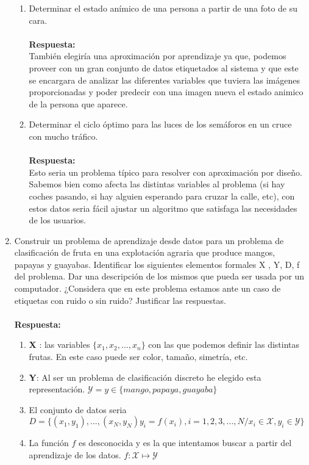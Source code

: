 \documentclass[12pt,a4paper]{article}
\begin{document}
\begin{enumerate}
\begin{enumerate}
		\item Determinar el estado anímico de una persona a partir de una foto de su cara.\\\\		\textbf{Respuesta:}\\
		También elegiría una aproximación por aprendizaje ya que, podemos proveer con un gran conjunto de datos etiquetados al sistema y que este se encargara de analizar las diferentes variables  que tuviera las imágenes proporcionadas y poder predecir con una imagen nueva el estado animico de la persona que aparece. 
		\item Determinar el ciclo óptimo para las luces de los semáforos en un cruce con mucho tráfico.\\\\		\textbf{Respuesta:}\\
		Esto seria un problema típico para resolver con aproximación por diseño. Sabemos bien como afecta las distintas variables al problema (si hay coches pasando, si  hay alguien esperando para cruzar la calle, etc), con estos datos seria fácil ajustar un algoritmo que satisfaga las necesidades de los usuarios.
	\end{enumerate}
	\item Construir un problema de aprendizaje desde datos para un problema de clasificación de fruta en una explotación agraria que produce mangos, papayas y guayabas. Identificar los siguientes elementos formales X , Y, D, f del problema. Dar una descripción de los mismos que pueda ser usada por un computador. ¿Considera que en este problema estamos ante un caso de etiquetas con ruido o sin ruido? Justificar las respuestas.\\\\
		\textbf{Respuesta:}\\
		\begin{enumerate}
			\item \textbf{X} : las variables $\{x_1,x_2,...,x_n\}$ con las que podemos definir las distintas frutas. En este caso puede ser color, tamaño, simetría, etc. 
			\item \textbf{Y}: Al ser un problema de clasificación discreto he elegido esta representación. $\mathcal{Y} = y \in \{mango, papaya, guayaba\}$
			\item El conjunto de datos seria $D = \{(x_1,y_1),...,(x_N, y_N) y_i=f(x_i),i=1,2,3,...,N/x_i \in \mathcal{X},y_i \in \mathcal{Y}\} $ 
			\item La función $f$ es desconocida y es la que intentamos buscar a partir del aprendizaje de los datos. $f : \mathcal{X} \mapsto \mathcal{Y}$
		\end{enumerate}
\end{enumerate}
\end{document}
